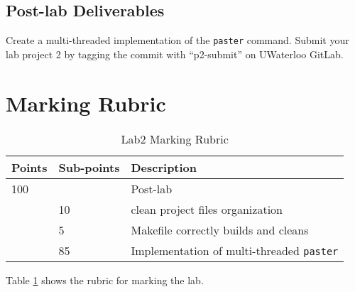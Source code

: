 \subsection{Post-lab Deliverables}
\label{sec:lab2-post-lab-deliverable}
Create a multi-threaded implementation of the \verb+paster+ command.
Submit your lab project 2 by tagging the commit with ``p2-submit'' on UWaterloo GitLab.
\iffalse
The following are the steps to create your post-lab deliverable submission.
\begin{itemize}
\item Create a directory and name it lab2.
\item Put the entire source code with a Makefile under the directory lab lab2. The Makefile default target is \verb+paster+. That is command \verb+make+ should generate the \verb+paster+ executable file. We also expect that command \verb+make clean+ will remove the object code and the default target. That is the \verb+.o+ files and the executable file should be removed.
\item Use \verb+zip+ command to zip up the contents of lab2 directory and name it lab2.zip. We expect \verb+unzip lab2.zip+ will produce a \verb+lab2+ sub-directory in the current working directory and under the \verb+lab2+ sub-directory is your source code and the Makefile.
\end{itemize}
Submit the \verb+lab2.zip+ file to Lab2 Dropbox in Learn.
\fi

\section{Marking Rubric}
\begin{table}[ht]
\begin{center}
\begin{tabular}{|p{2cm}|p{2cm}|p{9cm}|}
\hline
Points & Sub-points &Description  \\ \hline
100    &       & Post-lab \\ \hline
       & 10    & clean project files organization \\ \hline
       & 5     & Makefile correctly builds and cleans \\ \hline
       & 85    & Implementation of multi-threaded \verb+paster+ \\ \hline
\end{tabular}
\caption{Lab2 Marking Rubric}
\label{tb_lab2_rubric}
\end{center}
\end{table}

Table \ref{tb_lab2_rubric} shows the rubric for marking the lab.

